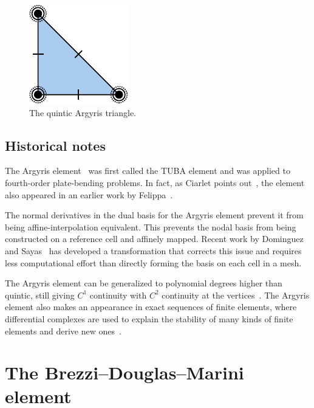 \begin{figure}[h]
  \begin{center}
    \includegraphics[width=\smallfig]{chapters/kirby-6/pdf/ARG5.pdf}
    \caption{The quintic Argyris triangle.}
  \end{center}
\end{figure}

\subsection{Historical notes}

The Argyris element~\cite{ArgyrisFriedEtAl1968} was first called the
TUBA element and was applied to fourth-order plate-bending problems.
In fact, as Ciarlet points out~\cite{Ciarlet2002}, the element also
appeared in an earlier work by Felippa~\cite{Felippa1966}.

The normal derivatives in the dual basis for the Argyris element
prevent it from being affine-interpolation equivalent. This prevents
the nodal basis from being constructed on a reference cell and
affinely mapped. Recent work by Dominguez and
Sayas~\cite{DominguezSayas2008} has developed a transformation that
corrects this issue and requires less computational effort than
directly forming the basis on each cell in a mesh.

The Argyris element can be generalized to polynomial degrees higher
than quintic, still giving \( C^1 \) continuity with \( C^2 \)
continuity at the vertices~\cite{SolinSegethEtAl2004}. The Argyris
element also makes an appearance in exact sequences of finite
elements, where differential complexes are used to explain the
stability of many kinds of finite elements and derive new
ones~\cite{ArnoldFalkEtAl2006}.

\newpage

\section{The Brezzi--Douglas--Marini element}

